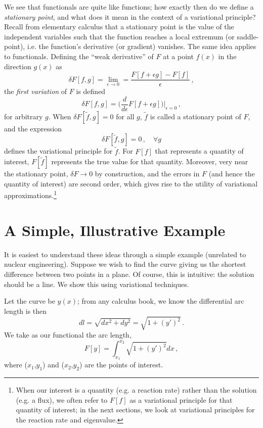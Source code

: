 We see that functionals are quite like functions; how exactly then do we define a \textit{stationary point}, and what does it mean in the context of a variational principle?  Recall from elementary calculus that a stationary point is the value of the independent variables such that the function reaches a local extremum (or saddle-point), i.e. the function's derivative (or gradient) vanishes.  The same idea applies to functionals.  Defining the ``weak derivative'' of $F$ at a point $f(x)$ in the direction $g(x)$ as
\begin{equation}
 \delta F[f,g] = \lim_{\epsilon \to 0} = \frac{ F[f+\epsilon g] - F[f] }{\epsilon} \, ,
\end{equation}
the \textit{first variation} of $F$ is defined 
\begin{equation}
 \delta F[f,g] = \Big ( \frac{d}{d\epsilon} F[f+\epsilon g] \Big )\Big |_{\epsilon = 0} \, ,
\end{equation}
for arbitrary $g$.  When $\delta F[\tilde{f},g] = 0$ for all $g$, $\tilde{f}$ is called a stationary point of $F$, and the expression
\begin{equation}
 \delta F[\tilde{f},g] = 0 \, ,  \, \, \, \, \, \, \forall g 
\end{equation}
defines the variational principle for $\tilde{f}$.  For $F[f]$ that represents a quantity of interest, $F[\tilde{f}]$ represents the true value for that quantity.  Moreover, very near the stationary point, $\delta F \to 0$ by construction, and the errors in $F$ (and hence the quantity of interest) are second order, which gives rise to the utility of variational approximations.\footnote{When our interest is a quantity (e.g. a reaction rate) rather than the solution (e.g. a flux), we often refer to $F[f]$ as a variational principle for that quantity of interest; in the next sections, we look at variational principles for the reaction rate and eigenvalue.}

\section*{A Simple, Illustrative Example}

It is easiest to understand these ideas through a simple example (unrelated to nuclear engineering).  Suppose we wish to find the curve giving us the shortest difference between two points in a plane.  Of course, this is intuitive: the solution should be a line.  We show this using variational techniques.  

Let the curve be $y(x)$; from any calculus book, we know the differential arc length is then
\begin{equation}
 dl = \sqrt{ dx^2 + dy^2 } = \sqrt{1 + (y')^2} \, .
\end{equation}
We take as our functional the arc length,
\begin{equation}
 F[y] = \int^{x_2}_{x_1} \sqrt{1 + (y')^2} dx \, ,
\end{equation}
where ($x_1$,$y_1$) and ($x_2$,$y_2$) are the points of interest.  

